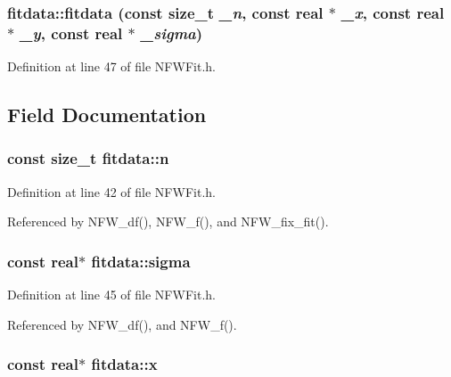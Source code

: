 \subsubsection[{fitdata}]{\setlength{\rightskip}{0pt plus 5cm}fitdata::fitdata (const size\_\-t {\em \_\-n}, \/  const {\bf real} $\ast$ {\em \_\-x}, \/  const {\bf real} $\ast$ {\em \_\-y}, \/  const {\bf real} $\ast$ {\em \_\-sigma})}\label{structfitdata_a588ee01742d71fb3cfb02d1efa0a9f86}


Definition at line 47 of file NFWFit.h.



\subsection{Field Documentation}
\subsubsection[{n}]{\setlength{\rightskip}{0pt plus 5cm}const size\_\-t {\bf fitdata::n}}\label{structfitdata_a9fd76a473fb5e9845ce8bb182504af18}


Definition at line 42 of file NFWFit.h.



Referenced by NFW\_\-df(), NFW\_\-f(), and NFW\_\-fix\_\-fit().

\subsubsection[{sigma}]{\setlength{\rightskip}{0pt plus 5cm}const {\bf real}$\ast$ {\bf fitdata::sigma}}\label{structfitdata_a057f1b2dbcd10242b528fb15218b8363}


Definition at line 45 of file NFWFit.h.



Referenced by NFW\_\-df(), and NFW\_\-f().

\subsubsection[{x}]{\setlength{\rightskip}{0pt plus 5cm}const {\bf real}$\ast$ {\bf fitdata::x}}\label{structfitdata_a490b6d70119259171e01c22dbd679e3c}


